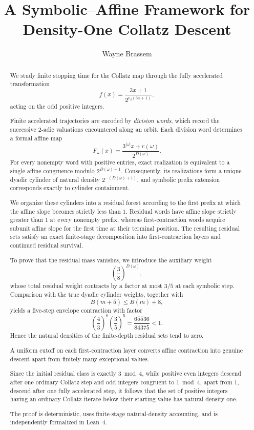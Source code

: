 \documentclass[12pt, oneside]{article}
\title{A Symbolic--Affine Framework for Density-One Collatz Descent}
\author{Wayne Brassem}
\numberwithin{equation}{section}
\theoremstyle{definition}
\theoremstyle{plain}
\theoremstyle{remark}
\begin{document}

\maketitle

\begin{abstract}

We study finite stopping time for the Collatz map through the fully
accelerated transformation
\[
f(x)=\frac{3x+1}{2^{v_2(3x+1)}},
\]
acting on the odd positive integers.

Finite accelerated trajectories are encoded by \emph{division words},
which record the successive \(2\)-adic valuations encountered along an
orbit. Each division word determines a formal affine map
\[
F_\omega(x)
=
\frac{3^{|\omega|}x+c(\omega)}{2^{D(\omega)}}.
\]
For every nonempty word with positive entries, exact realization is
equivalent to a single affine congruence modulo
\(2^{D(\omega)+1}\). Consequently, its realizations form a unique dyadic
cylinder of natural density \(2^{-(D(\omega)+1)}\), and symbolic prefix
extension corresponds exactly to cylinder containment.

We organize these cylinders into a residual forest according to the first
prefix at which the affine slope becomes strictly less than \(1\). Residual
words have affine slope strictly greater than \(1\) at every nonempty prefix,
whereas first-contraction words acquire subunit affine slope for the first
time at their terminal position. The resulting residual sets satisfy an
exact finite-stage decomposition into first-contraction layers and continued
residual survival.

To prove that the residual mass vanishes, we introduce the auxiliary weight
\[
\left(\frac38\right)^{D(\omega)},
\]
whose total residual weight contracts by a factor at most \(3/5\) at each
symbolic step. Comparison with the true dyadic cylinder weights, together
with
\[
B(m+5)\le B(m)+8,
\]
yields a five-step envelope contraction with factor
\[
\left(\frac43\right)^8\left(\frac35\right)^5
=
\frac{65536}{84375}
<1.
\]
Hence the natural densities of the finite-depth residual sets tend to zero.

A uniform cutoff on each first-contraction layer converts affine contraction
into genuine descent apart from finitely many exceptional values.

Since the initial residual class is exactly \(3\bmod4\), while positive even
integers descend after one ordinary Collatz step and odd integers congruent
to \(1\bmod4\), apart from \(1\), descend after one fully accelerated step,
it follows that the set of positive integers having an ordinary Collatz
iterate below their starting value has natural density one.

The proof is deterministic, uses finite-stage natural-density accounting,
and is independently formalized in Lean~4.

\end{abstract}
\end{document}
